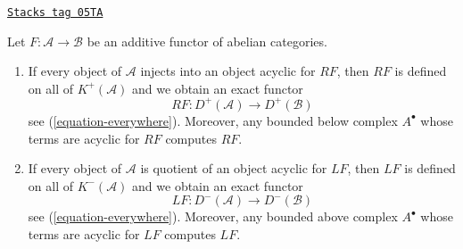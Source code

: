 \begin{proposition}
\label{derived-proposition-enough-acyclics}
\href{https://stacks.math.columbia.edu/tag/05TA}{\texttt{Stacks tag 05TA}}


Let $F : \mathcal{A} \to \mathcal{B}$ be an additive functor of
abelian categories.
\begin{enumerate}
\item If every object of $\mathcal{A}$ injects into an object acyclic
for $RF$, then $RF$ is defined on all of $K^{+}(\mathcal{A})$
and we obtain an exact functor
$$
RF : D^{+}(\mathcal{A}) \longrightarrow D^{+}(\mathcal{B})
$$
see (\ref{equation-everywhere}). Moreover, any bounded below complex
$A^\bullet$ whose terms are acyclic for $RF$ computes $RF$.
\item If every object of $\mathcal{A}$ is quotient of
an object acyclic for $LF$, then $LF$ is defined on all of
$K^{-}(\mathcal{A})$ and we obtain an exact functor
$$
LF : D^{-}(\mathcal{A}) \longrightarrow D^{-}(\mathcal{B})
$$
see (\ref{equation-everywhere}). Moreover, any bounded above complex
$A^\bullet$ whose terms are acyclic for $LF$ computes $LF$.
\end{enumerate}
\end{proposition}


